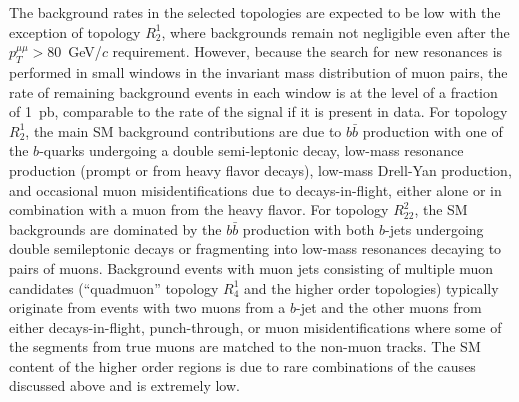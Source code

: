 The background rates in the selected topologies are expected to be low with the exception of topology $R^1_{2}$, where backgrounds remain not negligible even after the $p_T^{\mu\mu}>80$~GeV/$c$ requirement. However, because the search for new resonances is performed in small windows in the invariant mass distribution of muon pairs, the rate of remaining background events in each window is at the level of a fraction of 1~pb, comparable to the rate of the signal if it is present in data. For topology $R^1_2$, the main SM background contributions are due to $b\bar{b}$ production with one of the $b$-quarks undergoing a double semi-leptonic decay, low-mass resonance production (prompt or from heavy flavor decays), low-mass Drell-Yan production, and occasional muon misidentifications due to decays-in-flight, either alone or in combination with a muon from the heavy flavor.  For topology $R^2_{22}$, the SM backgrounds are dominated by the $b\bar{b}$ production with both $b$-jets undergoing double semileptonic decays or fragmenting into low-mass resonances decaying to pairs of muons. Background events with muon jets consisting of multiple muon candidates (``quadmuon'' topology $R^1_{4}$ and the higher order topologies) typically originate from events with two muons from a $b$-jet and the other muons from either decays-in-flight, punch-through, or muon misidentifications where some of the segments from true muons are matched to the non-muon tracks. The SM content of the higher order regions is due to rare combinations of the causes discussed above and is extremely low. 

